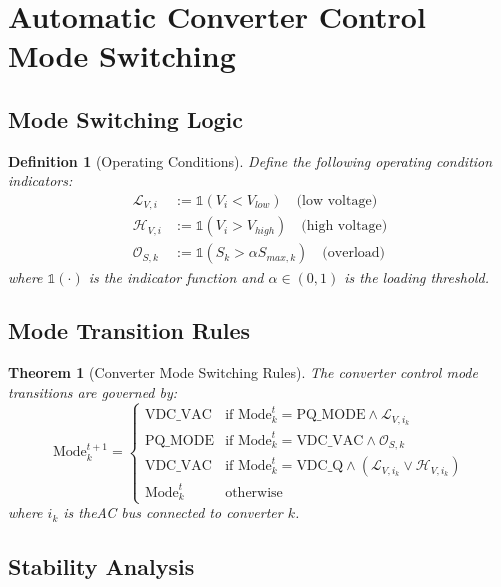 \documentclass[11pt]{article}
\newtheorem{theorem}{Theorem}
\newtheorem{definition}{Definition}
\begin{document}
\section{Automatic Converter Control Mode Switching}

\subsection{Mode Switching Logic}

\begin{definition}[Operating Conditions]
Define the following operating condition indicators:
\begin{align}
\mathcal{L}_{V,i} &:= \mathbb{1}(V_i < V_{low}) \quad \text{(low voltage)} \\
\mathcal{H}_{V,i} &:= \mathbb{1}(V_i > V_{high}) \quad \text{(high voltage)} \\
\mathcal{O}_{S,k} &:= \mathbb{1}(S_k > \alpha S_{max,k}) \quad \text{(overload)}
\end{align}
where $\mathbb{1}(\cdot)$ is the indicator function and $\alpha \in (0,1)$ is the loading threshold.
\end{definition}

\subsection{Mode Transition Rules}

\begin{theorem}[Converter Mode Switching Rules]
The converter control mode transitions are governed by:
\begin{equation}
\text{Mode}_{k}^{t+1} = \begin{cases}
\text{VDC\_VAC} & \text{if Mode}_k^t = \text{PQ\_MODE} \land \mathcal{L}_{V,i_k} \\
\text{PQ\_MODE} & \text{if Mode}_k^t = \text{VDC\_VAC} \land \mathcal{O}_{S,k} \\
\text{VDC\_VAC} & \text{if Mode}_k^t = \text{VDC\_Q} \land (\mathcal{L}_{V,i_k} \lor \mathcal{H}_{V,i_k}) \\
\text{Mode}_k^t & \text{otherwise}
\end{cases}
\end{equation}
where $i_k$ is theAC bus connected to converter $k$.
\end{theorem}

\subsection{Stability Analysis}
\end{document}
